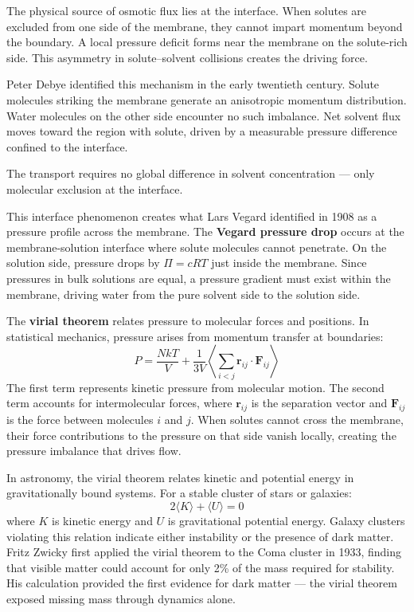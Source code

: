 The physical source of osmotic flux lies at the interface. When solutes are excluded from one side of the membrane, they cannot impart momentum beyond the boundary. A local pressure deficit forms near the membrane on the solute-rich side. This asymmetry in solute–solvent collisions creates the driving force.

Peter Debye identified this mechanism in the early twentieth century. Solute molecules striking the membrane generate an anisotropic momentum distribution. Water molecules on the other side encounter no such imbalance. Net solvent flux moves toward the region with solute, driven by a measurable pressure difference confined to the interface.

The transport requires no global difference in solvent concentration — only molecular exclusion at the interface.

This interface phenomenon creates what Lars Vegard identified in 1908 as a pressure profile across the membrane. The \textbf{Vegard pressure drop} occurs at the membrane-solution interface where solute molecules cannot penetrate. On the solution side, pressure drops by $\Pi = cRT$ just inside the membrane. Since pressures in bulk solutions are equal, a pressure gradient must exist within the membrane, driving water from the pure solvent side to the solution side.

The \textbf{virial theorem} relates pressure to molecular forces and positions. In statistical mechanics, pressure arises from momentum transfer at boundaries:
\[
P = \frac{NkT}{V} + \frac{1}{3V}\left\langle \sum_{i<j} \mathbf{r}_{ij} \cdot \mathbf{F}_{ij} \right\rangle
\]
The first term represents kinetic pressure from molecular motion. The second term accounts for intermolecular forces, where $\mathbf{r}_{ij}$ is the separation vector and $\mathbf{F}_{ij}$ is the force between molecules $i$ and $j$. When solutes cannot cross the membrane, their force contributions to the pressure on that side vanish locally, creating the pressure imbalance that drives flow.

In astronomy, the virial theorem relates kinetic and potential energy in gravitationally bound systems. For a stable cluster of stars or galaxies:
\[
2\langle K \rangle + \langle U \rangle = 0
\]
where $K$ is kinetic energy and $U$ is gravitational potential energy. Galaxy clusters violating this relation indicate either instability or the presence of dark matter. Fritz Zwicky first applied the virial theorem to the Coma cluster in 1933, finding that visible matter could account for only 2\% of the mass required for stability. His calculation provided the first evidence for dark matter — the virial theorem exposed missing mass through dynamics alone.


